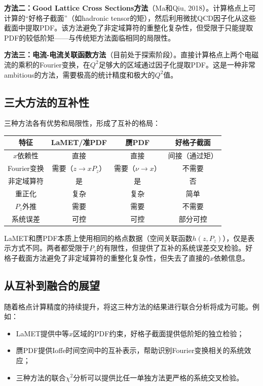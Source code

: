 \documentclass[11pt,a4paper]{ctexart}
\begin{document}
\textbf{方法二：Good Lattice Cross Sections方法}（Ma和Qiu, 2018）。计算格点上可计算的``好格子截面''（如hadronic tensor的矩），然后利用微扰QCD因子化从这些截面中提取PDF。该方法避免了非定域算符的重整化复杂性，但受限于只能提取PDF的较低阶矩——与传统矩方法面临相同的局限性。

\textbf{方法三：电流-电流关联函数方法}（目前处于探索阶段）。直接计算格点上两个电磁流的乘积的Fourier变换，在$Q^2$足够大的区域通过因子化提取PDF。这是一种非常ambitious的方法，需要极高的统计精度和极大的$Q^2$值。

\subsection{三大方法的互补性}

三种方法各有优势和局限性，形成了互补的格局：

\begin{center}
\begin{tabular}{c c c c}
\toprule
\textbf{特征} & \textbf{LaMET/准PDF} & \textbf{赝PDF} & \textbf{好格子截面} \\
\midrule
$x$依赖性 & 直接 & 直接 & 间接（通过矩） \\
Fourier变换 & 需要（$z \to xP_z$） & 需要（$\nu \to x$） & 不需要 \\
非定域算符 & 是 & 是 & 否 \\
重正化 & 复杂 & 复杂 & 简单 \\
$P_z$外推 & 需要 & 需要 & 不需要 \\
系统误差 & 可控 & 可控 & 部分可控 \\
\bottomrule
\end{tabular}
\end{center}

LaMET和赝PDF本质上使用相同的格点数据（空间关联函数$h(z, P_z)$），仅是表示方式不同。两者都受限于$P_z$的有限性，但提供了互补的系统误差交叉检验。好格子截面方法避免了非定域算符的重整化复杂性，但失去了直接的$x$依赖信息。

\subsection{从互补到融合的展望}

随着格点计算精度的持续提升，将这三种方法的结果进行联合分析将成为可能。例如：
\begin{itemize}
  \item LaMET提供中等$x$区域的PDF约束，好格子截面提供低阶矩的独立检验；
  \item 赝PDF提供Ioffe时间空间中的互补表示，帮助识别Fourier变换相关的系统效应；
  \item 三种方法的联合$\chi^2$分析可以提供比任一单独方法更严格的系统交叉检验。
\end{itemize}
\end{document}
